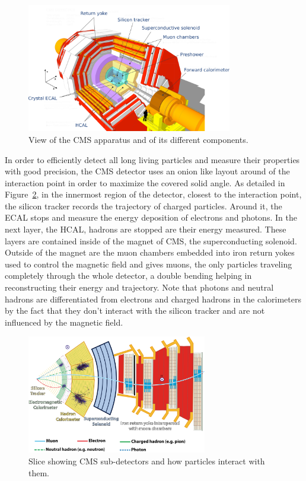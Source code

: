 	\begin{figure}[H]
		\centering
		\includegraphics[width=0.8\textwidth]{fig/chapt2/CMS_detail.pdf}
		\caption{\label{fig:CMS-detail} View of the CMS apparatus and of its different components.}
	\end{figure}
	
	In order to efficiently detect all long living particles and measure their properties with good precision, the CMS detector uses an onion like layout around of the interaction point in order to maximize the covered solid angle. As detailed in Figure~\ref{fig:CMS-slice}, in the innermost region of the detector, closest to the interaction point, the silicon tracker records the trajectory of charged particles. Around it, the \acf{ECAL} stops and measure the energy deposition of electrons and photons. In the next layer, the \acf{HCAL}, hadrons are stopped are their energy measured. These layers are contained inside of the magnet of CMS, the superconducting solenoid. Outside of the magnet are the muon chambers embedded into iron return yokes used to control the magnetic field and gives muons, the only particles traveling completely through the whole detector, a double bending helping in reconstructing their energy and trajectory. Note that photons and neutral hadrons are differentiated from electrons and charged hadrons in the calorimeters by the fact that they don't interact with the silicon tracker and are not influenced by the magnetic field.
	
	\begin{figure}[H]
		\centering
		\includegraphics[width=0.7\textwidth]{fig/chapt2/CMS_slice.png}
		\caption{\label{fig:CMS-slice} Slice showing CMS sub-detectors and how particles interact with them.}
	\end{figure}
	
